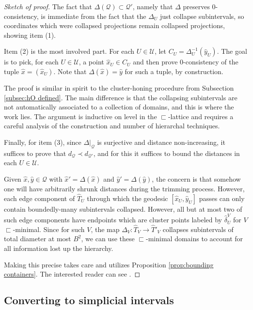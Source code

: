 \documentclass{amsart}
\theoremstyle{definition}
\theoremstyle{remark}
\theoremstyle{definition}
\newcommand{\calQ}{\mathcal{Q}}
\newcommand{\calU}{\mathcal{U}}
\newcommand{\hT}{\widehat{T}}
\newcommand{\hx}{\hat{x}}
\newcommand{\hy}{\hat{y}}
\newcommand{\hd}{\hat{\delta}}
\newcommand{\nest}{\sqsubset}
\begin{document}
\begin{proof}[Sketch of proof]
The fact that $\Delta(\calQ) \subset \calQ'$, namely that $\Delta$ preserves $0$-consistency, is immediate from the fact that the $\Delta_U$ just collapse subintervals, so coordinates which were collapsed projections remain collapsed projections, showing item (1).

Item (2) is the most involved part.  For each $U \in \calU$, let $C_U = \Delta^{-1}_U(\hy_U)$.  The goal is to pick, for each $U \in \calU$, a point $\hx_U \in C_U$ and then prove $0$-consistency of the tuple $\hx = (\hx_U)$.  Note that $\Delta(\hx) =\hy$ for such a tuple, by construction.

The proof is similar in spirit to the cluster-honing procedure from Subsection \ref{subsec:hO defined}.  The main difference is that the collapsing subintervals are not automatically associated to a collection of domains, and this is where the work lies.  The argument is inductive on level in the $\nest$-lattice and requires a careful analysis of the construction and number of hierarchal techniques.

Finally, for item (3), since $\Delta|_{\calQ}$ is surjective and distance non-increasing, it suffices to prove that $d_{\calQ} \prec d_{\calQ'}$, and for this it suffices to bound the distances in each $U \in \calU$.

Given $\hx, \hy \in \calQ$ with $\hx' = \Delta(\hx)$ and $\hy' = \Delta(\hy)$, the concern is that somehow one will have arbitrarily shrunk distances during the trimming process.  However, each edge component of $\hT_U$ through which the geodesic $[\hx_U,\hy_U]$ passes can only contain boundedly-many subintervals collapsed.  However, all but at most two of such edge components have endpoints which are cluster points labeled by $\hd^V_U$ for $V$ $\nest$-minimal.  Since for such $V$, the map $\Delta_V:\hT_V \to \hT'_V$ collapses subintervals of total diameter at most $B^2$, we can use these $\nest$-minimal domains to account for all information lost up the hierarchy.

Making this precise takes care and utilizes Proposition \ref{prop:bounding containers}.  The interested reader can see \cite[Section 10]{Dur_infcube}. 
\end{proof}

\subsection{Converting to simplicial intervals}
\end{document}
